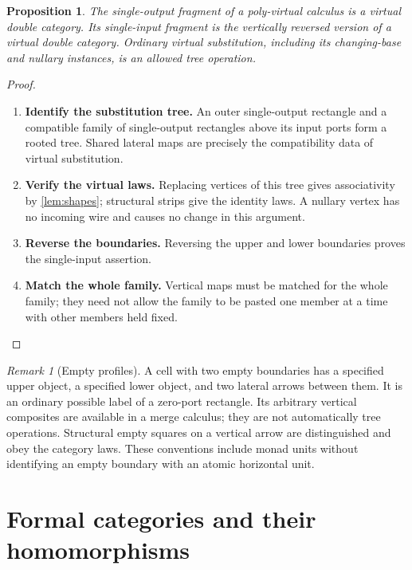 \documentclass[11pt,reqno]{amsart}
\theoremstyle{plain}
\newtheorem{proposition}[theorem]{Proposition}
\theoremstyle{definition}
\theoremstyle{remark}
\newtheorem{remark}[theorem]{Remark}
\numberwithin{equation}{section}
\begin{document}
\begin{proposition}\label{prop:fragments}
The single-output fragment of a poly-virtual calculus is a virtual double
category. Its single-input fragment is the vertically reversed version of
a virtual double category. Ordinary virtual substitution, including its
changing-base and nullary instances, is an allowed tree operation.
\end{proposition}
\begin{proof}\leavevmode
\begin{enumerate}
\item \textbf{Identify the substitution tree.} An outer single-output rectangle and a compatible family of single-output
rectangles above its input ports form a rooted tree. Shared lateral maps
are precisely the compatibility data of virtual substitution.

\item \textbf{Verify the virtual laws.} Replacing
vertices of this tree gives associativity by \cref{lem:shapes}; structural
strips give the identity laws. A nullary vertex has no incoming wire and
causes no change in this argument.

\item \textbf{Reverse the boundaries.} Reversing the upper and lower boundaries
proves the single-input assertion.

\item \textbf{Match the whole family.} Vertical maps must be matched for the
whole family; they need not allow the family to be pasted one member at a
time with other members held fixed.\qedhere
\end{enumerate}
\end{proof}

\begin{remark}[Empty profiles]
A cell with two empty boundaries has a specified upper object, a specified
lower object, and two lateral arrows between them. It is an ordinary
possible label of a zero-port rectangle. Its arbitrary vertical composites
are available in a merge calculus; they are not automatically tree
operations. Structural empty squares on a vertical arrow are distinguished
and obey the category laws. These conventions include monad units without
identifying an empty boundary with an atomic horizontal unit.
\end{remark}

\section{Formal categories and their homomorphisms}\label{sec:monads}
\end{document}
